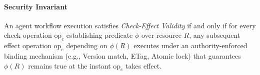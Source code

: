 \paragraph{Security Invariant}
An agent workflow execution satisfies \emph{Check-Effect Validity} if and only if for every check operation $\text{op}_c$ establishing predicate $\phi$ over resource $R$, any subsequent effect operation $\text{op}_e$ depending on $\phi(R)$ executes under an authority-enforced binding mechanism (e.g., Version match, ETag, Atomic lock) that guarantees $\phi(R)$ remains true at the instant $\text{op}_e$ takes effect.

